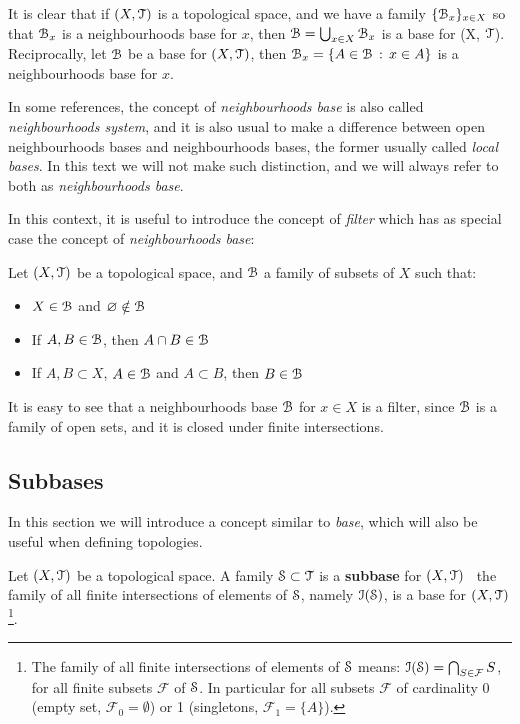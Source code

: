 It is clear that if $(X,\T)$ is a topological space, and we have a family
$\{\B_x\}_{x\in X}$ so that $\B_x$ is a neighbourhoods base for $x$, then
$\B=\bigcup_{x\in X}\B_x$ is a base for (X, $\T$).
Reciprocally, let $\B$ be a base for $(X, \T)$, then $\B_x = \setdef{A\in\B}{x\in A}$ is
a neighbourhoods base for $x$.

\begin{remark}
	In some references, the concept of \emph{neighbourhoods base} is also called
	\emph{neighbourhoods system}, and it is also usual to make a difference between
	open neighbourhoods bases and neighbourhoods bases, the former usually called
	\emph{local bases}. In this text we will not make such distinction, and we will
	always refer to both as \emph{neighbourhoods base}.
\end{remark}

In this context, it is useful to introduce the concept of \emph{filter}
which has as special case the concept of \emph{neighbourhoods base}:

\begin{definition}
	\label{def:filter}
	Let $(X, \T)$ be a topological space, and $\B$ a family of subsets of $X$ such that:
	\begin{itemize}
		\item $X\in\B$ and $\emptyset\notin\B$
		\item If $A, B\in\B$, then $A\cap B\in\B$
		\item If $A,B\subset X$, $A\in\B$ and $A\subset B$, then $B\in\B$
	\end{itemize}
\end{definition}

It is easy to see that a neighbourhoods base $\B$ for $x\in X$ is a filter, since
$\B$ is a family of open sets, and it is closed under finite intersections.


\subsection{Subbases}\label{subsec:subbases}

In this section we will introduce a concept similar to \emph{base}, which will also be
useful when defining topologies.

\begin{definition}
\label{def:subbase}
	Let $(X, \T)$ be a topological space.
	A family $\S\subset \T$ is a \textbf{subbase}	for $(X, \T)$ \iff\ the family of all finite intersections
	of elements of $\S$, namely	$\I(\S)$, is a base for $(X, \T)$\footnote{The family of all finite intersections of
	elements of $\S$ means: $\I(\S) = \bigcap_{S\in\mathcal{F}} S$, for all finite subsets
	$\mathcal{F}$ of $\S$. In particular for all subsets $\mathcal{F}$ of cardinality
	0 (empty set, $\mathcal{F}_0=\emptyset$) or 1 (singletons, $\mathcal{F}_1=\{A\}$).}.
\end{definition}

